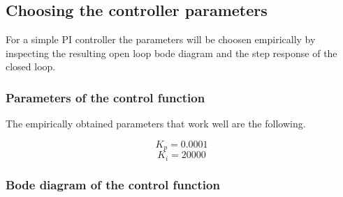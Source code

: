 \subsection{Choosing the controller parameters}
For a simple PI controller the parameters will be choosen empirically by
inspecting the resulting open loop bode diagram and the step response of the
closed loop.

\subsubsection{Parameters of the control function}
The empirically obtained parameters that work well are the following.

\[ K_p = 0.0001 \]
\[ K_i = 20000 \]

\subsubsection{Bode diagram of the control function}
